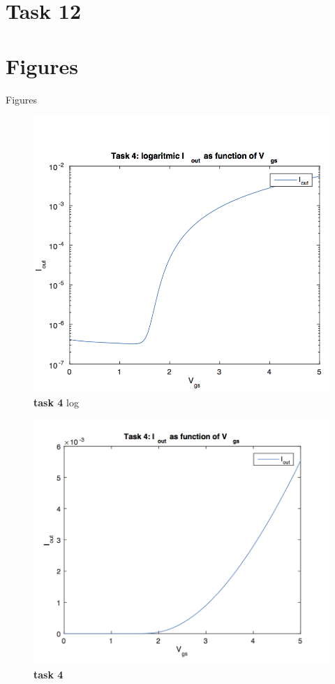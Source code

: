 \documentclass[11pt,a4paper,final]{report}
\begin{document}
\section{Task 12}


\section{Figures}
Figures
\begin{figure}[hbt!p]
\caption{\textbf{task 4} log}
\includegraphics[scale=0.6]{4task4log.png}
\end{figure}

\begin{figure}[h!bt!p]
\caption{\textbf{task 4}}
\includegraphics[scale=0.7]{4task4.png}
\end{figure}
\end{document}
